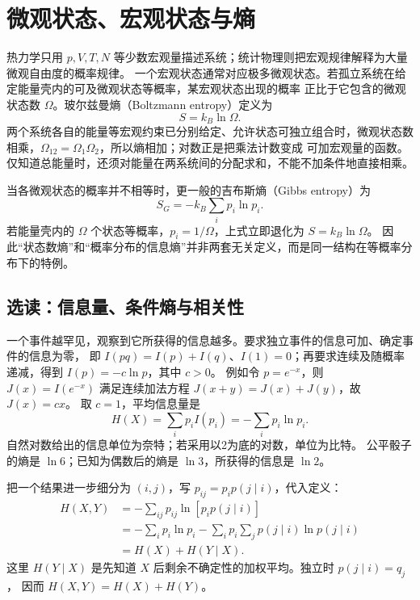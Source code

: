 \section{微观状态、宏观状态与熵}

热力学只用 $p,V,T,N$ 等少数宏观量描述系统；统计物理则把宏观规律解释为大量微观自由度的概率规律。
一个宏观状态通常对应极多微观状态。若孤立系统在给定能量壳内的可及微观状态等概率，某宏观状态出现的概率
正比于它包含的微观状态数 $\Omega$。玻尔兹曼熵（Boltzmann entropy）定义为
\begin{equation}
 S=k_B\ln\Omega.
\end{equation}
两个系统各自的能量等宏观约束已分别给定、允许状态可独立组合时，微观状态数相乘，$\Omega_{12}=\Omega_1\Omega_2$，所以熵相加；对数正是把乘法计数变成
可加宏观量的函数。
仅知道总能量时，还须对能量在两系统间的分配求和，不能不加条件地直接相乘。

当各微观状态的概率并不相等时，更一般的吉布斯熵（Gibbs entropy）为
\begin{equation}
 S_G=-k_B\sum_i p_i\ln p_i.
\end{equation}
若能量壳内的 $\Omega$ 个状态等概率，$p_i=1/\Omega$，上式立即退化为 $S=k_B\ln\Omega$。
因此“状态数熵”和“概率分布的信息熵”并非两套无关定义，而是同一结构在等概率分布下的特例。
\subsection{选读：信息量、条件熵与相关性}

一个事件越罕见，观察到它所获得的信息越多。要求独立事件的信息可加、确定事件的信息为零，
即 $I(pq)=I(p)+I(q)$、$I(1)=0$；再要求连续及随概率递减，得到 $I(p)=-c\ln p$，其中 $c>0$。
例如令 $p=e^{-x}$，则 $J(x)=I(e^{-x})$ 满足连续加法方程 $J(x+y)=J(x)+J(y)$，故 $J(x)=cx$。
取 $c=1$，平均信息量是
\[H(X)=\sum_i p_i I(p_i)=-\sum_i p_i\ln p_i.\]
自然对数给出的信息单位为奈特；若采用以2为底的对数，单位为比特。
公平骰子的熵是 $\ln6$；已知为偶数后的熵是 $\ln3$，所获得的信息是 $\ln2$。

把一个结果进一步细分为 $(i,j)$，写 $p_{ij}=p_i p(j\mid i)$，代入定义：
\begin{align*}
 H(X,Y)&=-\sum_{ij}p_{ij}\ln[p_i p(j\mid i)]\\
 &= -\sum_i p_i\ln p_i
    -\sum_i p_i\sum_jp(j\mid i)\ln p(j\mid i)\\
 &=H(X)+H(Y\mid X).
\end{align*}
这里 $H(Y\mid X)$ 是先知道 $X$ 后剩余不确定性的加权平均。独立时 $p(j\mid i)=q_j$，
因而 $H(X,Y)=H(X)+H(Y)$。

